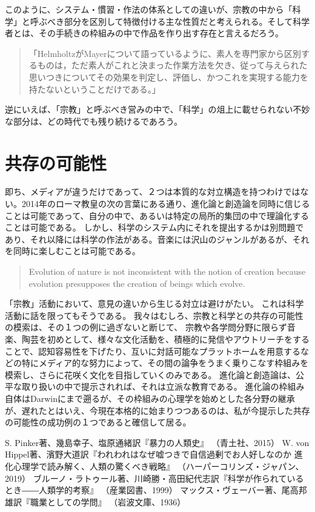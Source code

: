 \documentclass[uplatex, 10.5pt, dvipdfmx]{jsarticle}
\begin{document}
このように、システム・慣習・作法の体系としての違いが、宗教の中から「科学」と呼ぶべき部分を区別して特徴付ける主な性質だと考えられる。そして科学者とは、その手続きの枠組みの中で作品を作り出す存在と言えるだろう。

\begin{quotation}
    「HelmholtzがMayerについて語っているように、素人を専門家から区別するものは，ただ素人がこれと決まった作業方法を欠き、従って与えられた思いつきについてその効果を判定し、評価し、かつこれを実現する能力を持たないということだけである。」\cite{ウェーバー}
\end{quotation}

逆にいえば、「宗教」と呼ぶべき営みの中で、「科学」の俎上に載せられない不妙な部分は、どの時代でも残り続けるであろう。

\section{共存の可能性}

即ち、メディアが違うだけであって、２つは本質的な対立構造を持つわけではない。2014年のローマ教皇の次の言葉にある通り、進化論と創造論を同時に信じることは可能であって、自分の中で、あるいは特定の局所的集団の中で理論化することは可能である。
しかし、科学のシステム内にそれを提出するかは別問題であり、それ以降には科学の作法がある。音楽には沢山のジャンルがあるが、それを同時に楽しむことは可能である。

\begin{quote}
    Evolution of nature is not inconsistent with the notion of creation because evolution presupposes the creation of beings which evolve.
\end{quote}

「宗教」活動において、意見の違いから生じる対立は避けがたい。
これは科学活動に話を限ってもそうである。
我々はむしろ、宗教と科学との共存の可能性の模索は、その１つの例に過ぎないと断じて、
宗教や各学問分野に限らず音楽、陶芸を初めとして、様々な文化活動を、積極的に発信やアウトリーチをすることで、認知容易性を下げたり、互いに対話可能なプラットホームを用意するなどの特にメディア的な努力によって、その間の論争をうまく乗りこなす枠組みを模索し、さらに花咲く文化を目指していくのみである。
進化論と創造論は、公平な取り扱いの中で提示されれば、それは立派な教育である。
進化論の枠組み自体はDarwinにまで遡るが、その枠組みの心理学を始めとした各分野の継承が、遅れたとはいえ、今現在本格的に始まりつつあるのは、私が今提示した共存の可能性の成功例の１つであると確信して居る。

\begin{thebibliography}{9}
        S. Pinker著、幾島幸子、塩原通緒訳『暴力の人類史』
        （青土社、2015）
        W. von Hippel著、濱野大道訳『われわれはなぜ嘘つきで自信過剰でお人好しなのか 進化心理学で読み解く、人類の驚くべき戦略』
        （ハーパーコリンズ・ジャパン、2019）
    ブルーノ・ラトゥール著、川崎勝・高田紀代志訳『科学が作られているとき――人類学的考察』
    （産業図書、1999）
    マックス・ヴェーバー著、尾高邦雄訳『職業としての学問』
    （岩波文庫、1936）
\end{thebibliography}
\end{document}
